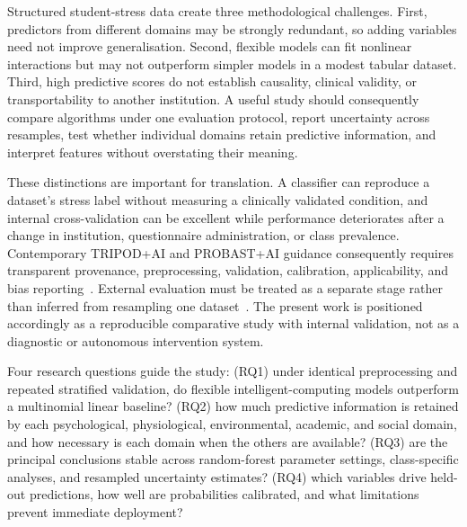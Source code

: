 \documentclass[review]{elsarticle}
\begin{document}
Structured student-stress data create three methodological challenges. First, predictors from different domains may be strongly redundant, so adding variables need not improve generalisation. Second, flexible models can fit nonlinear interactions but may not outperform simpler models in a modest tabular dataset. Third, high predictive scores do not establish causality, clinical validity, or transportability to another institution. A useful study should consequently compare algorithms under one evaluation protocol, report uncertainty across resamples, test whether individual domains retain predictive information, and interpret features without overstating their meaning.

These distinctions are important for translation. A classifier can reproduce a dataset's stress label without measuring a clinically validated condition, and internal cross-validation can be excellent while performance deteriorates after a change in institution, questionnaire administration, or class prevalence. Contemporary TRIPOD+AI and PROBAST+AI guidance consequently requires transparent provenance, preprocessing, validation, calibration, applicability, and bias reporting~\cite{collins2024,moons2025}. External evaluation must be treated as a separate stage rather than inferred from resampling one dataset~\cite{van2024evaluation}. The present work is positioned accordingly as a reproducible comparative study with internal validation, not as a diagnostic or autonomous intervention system.

Four research questions guide the study: (RQ1) under identical preprocessing and repeated stratified validation, do flexible intelligent-computing models outperform a multinomial linear baseline? (RQ2) how much predictive information is retained by each psychological, physiological, environmental, academic, and social domain, and how necessary is each domain when the others are available? (RQ3) are the principal conclusions stable across random-forest parameter settings, class-specific analyses, and resampled uncertainty estimates? (RQ4) which variables drive held-out predictions, how well are probabilities calibrated, and what limitations prevent immediate deployment?
\end{document}
